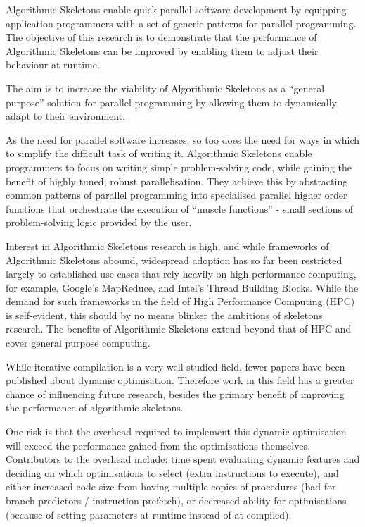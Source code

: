 Algorithmic Skeletons enable quick parallel software development by
equipping application programmers with a set of generic patterns for
parallel programming. The objective of this research is to demonstrate
that the performance of Algorithmic Skeletons can be improved by
enabling them to adjust their behaviour at runtime.

The aim is to increase the viability of Algorithmic Skeletons as a
“general purpose” solution for parallel programming by allowing them
to dynamically adapt to their environment.

As the need for parallel software increases, so too does the need for
ways in which to simplify the difficult task of writing
it. Algorithmic Skeletons enable programmers to focus on writing
simple problem-solving code, while gaining the benefit of highly
tuned, robust parallelisation. They achieve this by abstracting common
patterns of parallel programming into specialised parallel higher
order functions that orchestrate the execution of ``muscle functions''
- small sections of problem-solving logic provided by the user.

Interest in Algorithmic Skeletons research is high, and while
frameworks of Algorithmic Skeletons abound, widespread adoption has so
far been restricted largely to established use cases that rely heavily
on high performance computing, for example, Google's MapReduce, and
Intel's Thread Building Blocks. While the demand for such frameworks
in the field of High Performance Computing (HPC) is self-evident, this
should by no means blinker the ambitions of skeletons research. The
benefits of Algorithmic Skeletons extend beyond that of HPC and cover
general purpose computing.

While iterative compilation is a very well studied field, fewer papers
have been published about dynamic optimisation. Therefore work in this
field has a greater chance of influencing future research, besides the
primary benefit of improving the performance of algorithmic skeletons.

One risk is that the overhead required to implement this dynamic
optimisation will exceed the performance gained from the optimisations
themselves. Contributors to the overhead include: time spent
evaluating dynamic features and deciding on which optimisations to
select (extra instructions to execute), and either increased code size
from having multiple copies of procedures (bad for branch predictors /
instruction prefetch), or decreased ability for optimisations (because
of setting parameters at runtime instead of at compiled).

